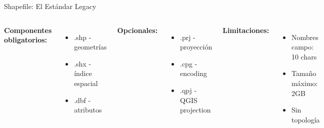 \documentclass[10pt]{beamer}
\begin{document}
\begin{frame}[fragile]{Shapefile: El Estándar Legacy}
    \begin{columns}
        \textbf{Componentes obligatorios:}
        \begin{itemize}
            \item .shp - geometrías
            \item .shx - índice espacial
            \item .dbf - atributos
        \end{itemize}
        
        \textbf{Opcionales:}
        \begin{itemize}
            \item .prj - proyección
            \item .cpg - encoding
            \item .qpj - QGIS projection
        \end{itemize}
        
        \textbf{Limitaciones:}
        \begin{itemize}
            \item Nombres campo: 10 chars
            \item Tamaño máximo: 2GB
            \item Sin topología
        \end{itemize}
        
        \begin{lstlisting}[language=Python, caption=Lectura de Shapefile]
import geopandas as gpd

# Leer shapefile
gdf = gpd.read_file('comunas.shp')

# Explorar estructura
print(gdf.head())
print(gdf.crs)
print(gdf.geometry.type.unique())

# Filtrar y guardar
santiago = gdf[gdf['COMUNA'] == 'Santiago']
santiago.to_file('santiago.shp')

# Convertir a otros formatos
gdf.to_file('comunas.geojson', 
            driver='GeoJSON')
gdf.to_file('comunas.gpkg', 
            driver='GPKG')
        \end{lstlisting}
    \end{columns}
\end{frame}
\end{document}
